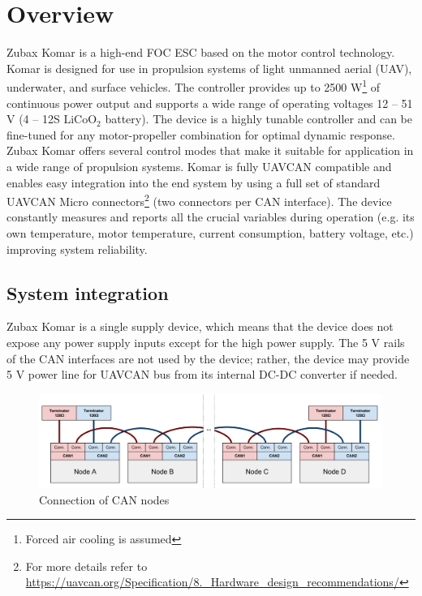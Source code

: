 \chapter{Overview}

Zubax Komar is a high-end FOC ESC based on the  motor control technology. 
Komar is designed for use in propulsion systems of light unmanned aerial (UAV), underwater, and surface vehicles. 
The controller provides up to 2500 W\footnote{Forced air cooling is assumed}
of continuous power output and supports a wide range of operating voltages 
12 -- 51 V (4 -- 12S $\text{LiCoO}_\text{2}$ battery). 
The device is a highly tunable controller and can be fine-tuned for any motor-propeller combination 
for optimal dynamic response. 
Zubax Komar offers several control modes that make it suitable for application in a wide range of propulsion systems. 
Komar is fully UAVCAN compatible and enables easy integration into the end system by using a full set 
of standard UAVCAN Micro connectors\footnote{For more details refer to 
\url{https://uavcan.org/Specification/8._Hardware_design_recommendations/}} (two connectors per CAN interface).
The device constantly measures and reports all the crucial variables during operation 
(e.g. its own temperature, motor temperature, current consumption, battery voltage, etc.) 
improving system reliability.

\section{System integration}
Zubax Komar is a single supply device, which means that the device does not expose any power supply inputs except 
for the high power supply. The 5 V rails of the CAN interfaces are not used by the device; 
rather, the device may provide 5 V power line for UAVCAN bus from its internal DC-DC converter if needed. 

\begin{figure}[h]
    \centering
    \includegraphics[width=1\textwidth]{figures/can_intergration.png}
    \caption{Connection of CAN nodes}
\end{figure}
